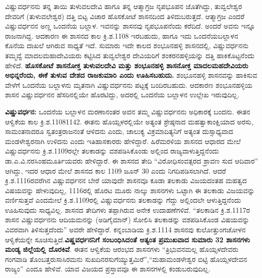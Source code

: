 ವಿಷ್ಣುವರ್ಧನನು ತನ್ನ ತಾಯಿ ತುಳುವಲದೇವಿ ಹಾಗೂ ತನ್ನ ಆತ್ಮಾಗ್ರಜ ನೃಪಭೂಪನ ಜೊತೆಗಿದ್ದು, ತುವ್ವಲೇಶ್ವರ ದೇವರಿಗೆ (ತುಳುವಲೇಶ್ವರ) ದತ್ತಿ ಬಿಟ್ಟ ವಿಚಾರ ಹೊಸಕೋಟೆ ಶಾಸನದಿಂದ ತಿಳಿದುಬರುತ್ತದೆ. ಆತ್ಮಾಗ್ರಜ ಎಂದರೆ ವಿಷ್ಣುವರ್ಧನನ ಅಣ್ಣ ಒಂದನೆಯ ಬಲ್ಲಾಳ. ಇವನನ್ನು ಶಾಸನವು ನೃಪಭೂಪನೆಂದು ಕರೆದಿದೆ. ಅಂದರೆ ಅವನು ಇನ್ನೂ ರಾಜನಾಗಿದ್ದ. ಆದಕಾರಣ ಈ ಶಾಸನದ ಕಾಲ ಕ್ರಿ.ಶ.1108 ಇರಬಹುದು, ಹಾಗೂ ಇದು ಒಂದನೆಯಬಲ್ಲಾಳನ ಕೊನೆಯ ದಾಖಲೆ ಆಗಿರುವ ಸಾಧ್ಯತೆ ಇದೆ. ಸುಮಾರು ಇದೇ ಕಾಲದ ಶಂಭೂನಹಳ್ಳಿ ಶಾಸನದಲ್ಲಿ, ವಿಷ್ಣುವರ್ಧನನು ತಮ್ಮವ್ವೆ ಮಾದಲಮಹಾದೇವಿಯರು ಕಟ್ಟಿಸಿದ ತುವ್ವಲೇಶ್ವರ ದೇವಿಯರಿಗೆ ಶಂಕರನಹಳ್ಳಿಯನ್ನು ದತ್ತಿ ಹಾಕಿಕೊಟ್ಟನೆಂದು ಹೇಳಿದೆ. \textbf{ಹೊಸಕೋಟೆ ಶಾಸನೋಕ್ತ ತುಳುವಲದೇವಿ ಮತ್ತು ಶಂಭೂನಹಳ್ಳಿ ಶಾಸನೋಕ್ತ ಮಾದಲಮಹದೇವಿಯರು ಅಭಿನ್ನರೆಂದು, ಈಕೆ ತುಳುವ ದೇಶದ ರಾಜಕುಮಾರಿ ಎಂದು ಊಹಿಸಬಹುದು.} ಶಂಭೂನಹಳ್ಳಿ ಶಾಸನವನ್ನು ಹಾಕಿಸುವ ವೇಳೆಗೆ ಒಂದನೆಯ ಬಲ್ಲಾಳನು ಮೃತನಾಗಿ ವಿಷ್ಣುವರ್ಧನನು ಪಟ್ಟಕ್ಕೆ ಬಂದಿರಬಹುದು. ಆದಕಾರಣ ಶಂಭೂನಹಳ್ಳಿಯ ಶಾಸನ ವಿಷ್ಣುವರ್ಧನನ ಹೆಸರಿನಲ್ಲಿಯೇ ಹೊರಟಿದ್ದು, ಅದರಲ್ಲಿ ಒಂದನೆಯ ಬಲ್ಲಾಳನ ಉಲ್ಲೇಖ ಇರುವುದಿಲ್ಲ.

\textbf{ವಿಷ್ಣುವರ್ಧನ:} ಒಂದನೆಯ ಬಲ್ಲಾಳನ ಮರಣಾನಂತರ ಅವನ ತಮ್ಮ ವಿಷ್ಣುವರ್ಧನನು ಅಧಿಕಾರಕ್ಕೆ ಬಂದನು. ಈತನ ಆಳ್ವಿಕೆಯ ಕಾಲ ಕ್ರಿ.ಶ.1108\enginline{-}1142. ಈತನು ಹೊಯ್ಸಳರಲ್ಲಿಯೇ ಅತ್ಯಂತ ಶ್ರೇಷ್ಠನಾದ ಮಹತ್ವಾಕಾಂಕ್ಷಿಯಾದ ಅರಸು, ಸಾಮಂತನಾದರೂ ಸ್ವತಂತ್ರರಾಜನಂತೆ ಆಳಿದನು ಎಂದು, ಚಾಲುಕ್ಯ ವಿಕ್ರಮಾದಿತ್ಯನಿಗೆ ಅತ್ಯಂತ ದುಸ್ಸಾಧ್ಯವಾದ ಮಂಡಳೇಶ್ವರನಾಗಿ ಉಳಿದನು ಎಂದು ಇತಿಹಾಸಕಾರರು ಹೇಳಿದ್ದಾರೆ. ಹಿರೆಮರಳಿಯ ಶಾಸನದ ಆಧಾರದ ಮೇಲೆ ವಿಷ್ಣುವರ್ಧನನು ಕ್ರಿ.ಶ.1109ರಲ್ಲೇ ತಲಕಾಡನ್ನು ವಶಪಡಿಸಿಕೊಂಡು ಅಲ್ಲಿಂದ ರಾಜ್ಯವಾಳುತ್ತಿದ್ದನೆಂದು ಡಾ.ಎ.ವಿ.ನರಸಿಂಹ\-ಮೂರ್ತಿಯವರು ಹೇಳಿದ್ದಾರೆ. ಈ ಶಾಸನದ ತೇದಿ “ವಿರೋಧಿಸಂವತ್ಸರದ ಶ್ರಾವಣ ಸುದ ಆದಿವಾರ” ಆಗಿದ್ದು, ಇದರ ಆಧಾರ ಮೇಲೆ ಶಾಸನದ ಕಾಲ 1109 ಜೂನ್​ 30 ಎಂದು ನಿಗದಿಪಡಿಸಲಾಗಿದೆ. ಆದರೆ ಕ್ರಿ.ಶ.1116ರವರೆಗಿನ ವಿಷ್ಣುವರ್ಧನನ ಬೇರೆ ಯಾವುದೇ ಶಾಸನವೂ ಕೂಡಾ ತಲಕಾಡು ವಿಜಯದಂತಹ ಮಹತ್ವದ ವಿಷಯವನ್ನು ಹೇಳುವುದಿಲ್ಲ, 1116ರಲ್ಲಿ ಹೊರಟ ಮೂರು ನಾಲ್ಕು ಶಾಸನಗಳು ಒಟ್ಟಾಗಿ ಈ ತಲಕಾಡು ವಿಜಯವನ್ನು ವರ್ಣಿಸುತ್ತವೆ ಎಂದಮೇಲೆ ಕ್ರಿ.ಶ.1109ರಲ್ಲಿ ವಿಷ್ಣುವರ್ಧನನು ತಲಕಾಡನ್ನು ಗೆದ್ದು ಅಲ್ಲಿಂದಲೇ ಆಳುತ್ತಿದ್ದನೆಂದು ಊಹಿಸುವುದು ಸಾಧ್ಯವಿಲ್ಲ. ಶಾಸನದ ತೇದಿಗಳು ತಪ್ಪಾಗಿರುವ ಅನೇಕ ಉದಾಹಣೆಗಳಿವೆ. “ತಲಕಾಡಿನ ಕ್ರಿ.ಶ.1117ರ ಶಾಸನ ವಿಷ್ಣುವರ್ಧನನು ಆದಿಯಮನನ್ನು (ಅಡಿಗೈಮಾನ್​) ಸೋಲಿಸಿ ತಲಕಾಡನ್ನು ವಶಪಡಿಸಿಕೊಂಡ ವಿಷಯವನ್ನು ವಿವರವಾಗಿ ತಿಳಿಸುತ್ತದೆಂದು” ಅವರೇ ಹೇಳಿದ್ದಾರೆ. ಕನ್ನಂಬಾಡಿಯ ಕ್ರಿ.ಶ.1114 ಶಾಸನವು ಕುಲೋತ್ತುಂಗಚೋಳನ ಆಳ್ವಿಕೆಯನ್ನೇ ಸೂಚಿಸುತ್ತಿದೆ.\textbf{ವಿಷ್ಣವರ್ಧನನಿಗೆ ಸಂಬಂಧಿಸಿ\-ದಂತೆ ಅತ್ಯಂತ ಪ್ರಮುಖವಾದ ಸುಮಾರು 32 ಶಾಸನಗಳು ಮಂಡ್ಯ ಜಿಲ್ಲೆಯಲ್ಲಿ ದೊರಕಿವೆ}. ಈತನ ಆಳ್ವಿಕೆಯ ಆರಂಭದ ಶಾಸನಗಳು “ತ್ರಿಭುವನಮಲ್ಲ ಹೊಯ್ಸಳದೇವರು ಗಂಗವಾಡಿ ತೊಂಬತ್ತರುಸಾಸಿರಮನು ಸುಖದಿನರಸುಗೆಯ್ಯುತ್ತಮಿರೆ”,\break “ಮಹಾಮಂಡಳೇಶ್ವರ ಬಿಟ್ಟಿ ಹೊಯ್ಸಳದೇವನ ರಾಜ್ಯಂ” ಎಂದೂ ಹೇಳಿವೆ. ಯಾವ ವಿಜಯದ ಪ್ರಸ್ತಾವವೂ ಈ ಶಾಸನಗಳಲ್ಲಿ ಕಂಡುಬರುವುದಿಲ್ಲ.

